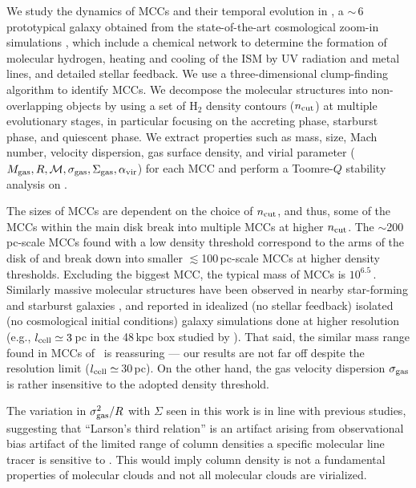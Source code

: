 \IfFileExists{emulateapjlegacy.cls}{\documentclass[iop]{emulateapjlegacy}}{\documentclass[iop]{emulateapj}}
\begin{document}
We study the dynamics of MCCs and their temporal evolution in \flower, a \z$\sim$\,6 prototypical galaxy obtained from the state-of-the-art cosmological zoom-in simulations , which include a chemical network to determine the formation of molecular hydrogen, heating and cooling of the ISM by UV radiation and metal lines, and detailed stellar feedback.
%
We use a three-dimensional clump-finding algorithm to identify MCCs. We decompose the molecular structures into non-overlapping objects by using a set of H$_2$ density contours ($n_{\rm cut}$) at multiple evolutionary stages, in particular focusing on the accreting phase, starburst phase, and quiescent phase. We extract properties such as mass, size, Mach number, velocity dispersion, gas surface density, and virial parameter ($M_{\rm gas}, R, \mathcal{M}, \sigma_{\rm gas}, \Sigma_{\rm gas}, \alpha_{\rm vir}$) for each MCC and perform a Toomre-$Q$ stability analysis on \flower.

The sizes of MCCs are dependent on the choice of $n_{\rm cut}$, and thus, some of the MCCs within the main disk break into multiple MCCs at higher $n_{\rm cut}$. The $\sim$200\,pc-scale MCCs found with a low density threshold correspond to the arms of the disk of \flower and break down into smaller $\lesssim$100\,pc-scale MCCs at higher density thresholds.
%
Excluding the biggest MCC, the typical mass of MCCs is $10^{6.5}$\,\Msun. Similarly massive molecular structures have been observed in nearby star-forming and starburst galaxies \citep[e.g.,][]{Keto05a, DonovanMeyer13a, Colombo14a, Leroy15a}, and reported in idealized (no stellar feedback) isolated (no cosmological initial conditions) galaxy simulations done at higher resolution (e.g., $l_{\rm cell}\simeq3$\,pc in the 48\,kpc box studied by \citealt{Behrendt16a}). That said, the similar mass range found in MCCs of \flower\ is reassuring --- our results are not far off despite the resolution limit ($l_{\rm cell}\simeq$\,30\,pc). On the other hand, the gas velocity dispersion $\sigma_{\rm gas}$ is rather insensitive to the adopted density threshold.


The variation in $\sigma_{\rm gas}^2/R$ with $\Sigma$ seen in this work is in line with previous studies, suggesting that ``Larson's third relation'' is an artifact arising from observational bias artifact of the limited range of  column densities a specific molecular line tracer is sensitive to \citep[][]{Ballesteros02a, Ballesteros11a}. This would imply column density is not a fundamental properties of molecular clouds and not all molecular clouds are virialized. 
\end{document}
